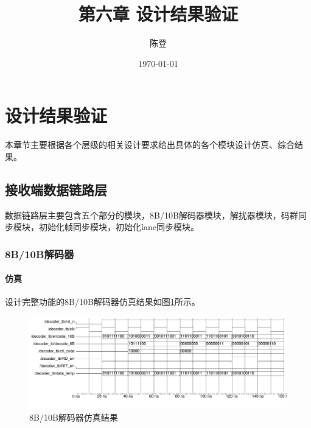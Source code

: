 \documentclass[UTF8]{ctexart}
\title{第六章 设计结果验证}
\author{陈登}
\date{\today}
\begin{document}
\section{设计结果验证}

本章节主要根据各个层级的相关设计要求给出具体的各个模块设计仿真、综合结果。

\subsection{接收端数据链路层}

数据链路层主要包含五个部分的模块，8B/10B解码器模块，解扰器模块，码群同步模块，初始化帧同步模块，初始化lane同步模块。

\subsubsection{8B/10B解码器}

\paragraph{仿真}

设计完整功能的8B/10B解码器仿真结果如图\ref{fig:8b_10b_decoder_wave}所示。

\begin{figure}[H]
	\centering
	\includegraphics[width=18cm]{./img/8b_10b_decoder_wave.pdf}
	\caption{8B/10B解码器仿真结果}
	\label{fig:8b_10b_decoder_wave}
\end{figure}
\end{document}
